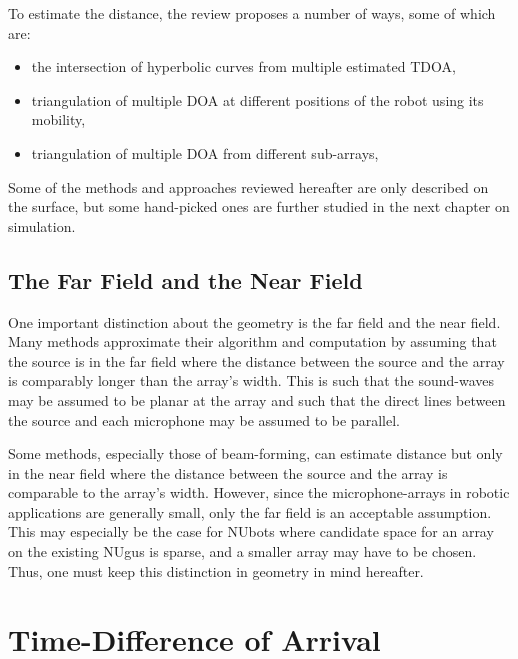 \documentclass[notitlepage]{report}
\begin{document}
To estimate the distance, the review proposes a number of ways, some of which are:
\begin{itemize}
	\item the intersection of hyperbolic curves from multiple estimated TDOA,
	\item triangulation of multiple DOA at different positions of the robot using its mobility,
	\item triangulation of multiple DOA from different sub-arrays,
\end{itemize}

Some of the methods and approaches reviewed hereafter are only described on the surface, but some hand-picked ones are further studied in the next chapter on simulation.

\subsection{The Far Field and the Near Field}

One important distinction about the geometry is the far field and the near field. Many methods approximate their algorithm and computation by assuming that the source is in the far field where the distance between the source and the array is comparably longer than the array's width. This is such that the sound-waves may be assumed to be planar at the array and such that the direct lines between the source and each microphone may be assumed to be parallel. 

Some methods, especially those of beam-forming, can estimate distance but only in the near field where the distance between the source and the array is comparable to the array's width. However, since the microphone-arrays in robotic applications are generally small, only the far field is an acceptable assumption. This may especially be the case for NUbots where candidate space for an array on the existing NUgus is sparse, and a smaller array may have to be chosen. Thus, one must keep this distinction in geometry in mind hereafter.

\section{Time-Difference of Arrival}
\end{document}
